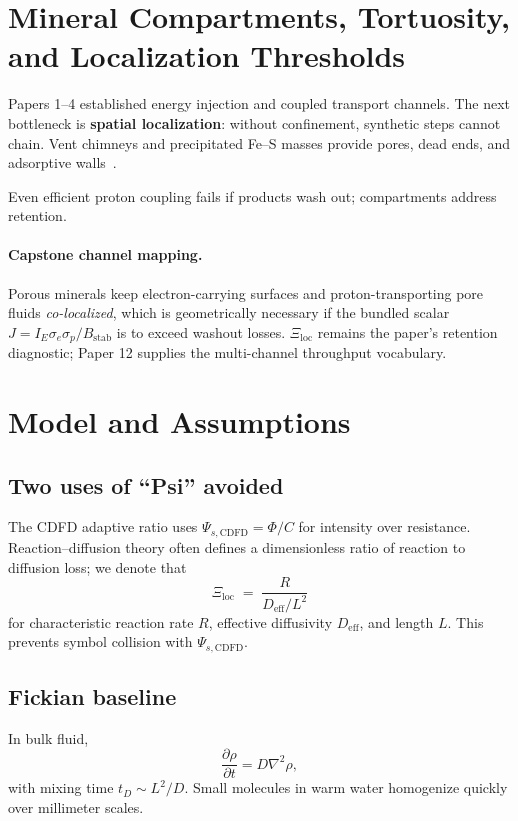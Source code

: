 \documentclass[11pt,a4paper]{article}
\begin{document}
\section{Mineral Compartments, Tortuosity, and Localization Thresholds}
Papers 1--4 established energy injection and coupled transport channels. The next bottleneck is \textbf{spatial localization}: without confinement, synthetic steps cannot chain. Vent chimneys and precipitated Fe--S masses provide pores, dead ends, and adsorptive walls~\cite{Russell1994,Hazen2008}.

Even efficient proton coupling fails if products wash out; compartments address retention.

\paragraph{Capstone channel mapping.}
Porous minerals keep electron-carrying surfaces and proton-transporting pore fluids \emph{co-localized}, which is geometrically necessary if the bundled scalar $J=I_E\sigma_e\sigma_p/B_{\mathrm{stab}}$ is to exceed washout losses. $\Xi_{\mathrm{loc}}$ remains the paper's retention diagnostic; Paper 12 supplies the multi-channel throughput vocabulary.

\section{Model and Assumptions}

\subsection{Two uses of ``Psi'' avoided}
The CDFD adaptive ratio uses $\Psi_{s,\mathrm{CDFD}}=\Phi/C$ for intensity over resistance. Reaction--diffusion theory often defines a dimensionless ratio of reaction to diffusion loss; we denote that
\begin{equation}
\Xi_{\mathrm{loc}} \;=\; \frac{R}{D_{\mathrm{eff}}/L^2}
\end{equation}
for characteristic reaction rate $R$, effective diffusivity $D_{\mathrm{eff}}$, and length $L$. This prevents symbol collision with $\Psi_{s,\mathrm{CDFD}}$.

\subsection{Fickian baseline}
In bulk fluid,
\begin{equation}
\frac{\partial \rho}{\partial t} = D\nabla^2\rho,
\end{equation}
with mixing time $t_D\sim L^2/D$. Small molecules in warm water homogenize quickly over millimeter scales.
\end{document}
